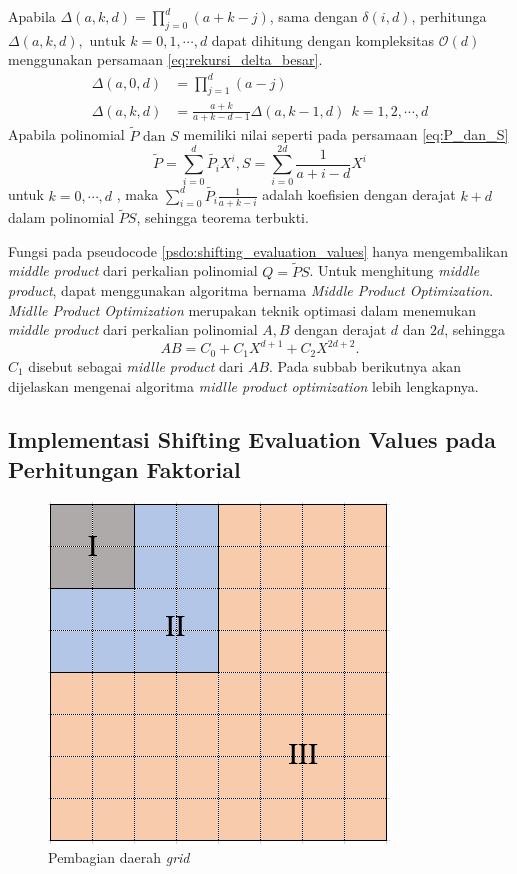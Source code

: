 Apabila  $ \Delta (a,k,d) = \prod_{j=0}^d (a+k-j) $, sama dengan $ \delta(i,d) $, perhitunga $ \Delta(a,k,d), \text{ untuk }k = 0, 1, \cdots, d $ dapat dihitung dengan kompleksitas $ \mathcal{O}{(d)} $ menggunakan persamaan \eqref{eq:rekursi_delta_besar}.
\begin{equation}
	\begin{aligned}
		\Delta (a,0,d) &= \prod_{j=1}^d(a-j) \\
		\Delta(a,k,d) &= \frac{a+k}{a+k - d - 1} \Delta(a,k-1,d)\ \ k = 1, 2, \cdots, d
	\end{aligned}
	\label{eq:rekursi_delta_besar}
\end{equation}
Apabila polinomial $ \tilde{P} \text{ dan } S $ memiliki nilai seperti pada persamaan \eqref{eq:P_dan_S}
\begin{equation}
	\tilde{P} = \sum_{i=0}^d \tilde{P_i} X^i , S = \sum_{i=0}^{2d} \frac{1}{a+i-d} X^i
	\label{eq:P_dan_S}
\end{equation}
untuk $ k=0, \cdots, d$ , maka $ \sum_{i=0}^d \tilde{P_i} \frac{1}{a+k-i} $ adalah koefisien dengan derajat $ k+d $ dalam polinomial $ \tilde{P}S $, sehingga teorema terbukti.

Fungsi pada pseudocode \ref{psdo:shifting_evaluation_values} hanya mengembalikan \textit{middle product} dari perkalian polinomial $ Q = \tilde{P}S $. Untuk menghitung \textit{middle product}, dapat menggunakan algoritma bernama \textit{Middle Product Optimization}.\textit{ Midlle Product Optimization} merupakan teknik optimasi dalam menemukan \textit{middle product} dari perkalian polinomial $ A , B $ dengan derajat $ d $ dan $ 2d $, sehingga $$ AB = C_0 + C_1X^{d+1} + C_2X^{2d+2}. $$ $ C_1 $ disebut sebagai \textit{midlle product} dari $ AB $. Pada subbab berikutnya akan dijelaskan mengenai algoritma \textit{midlle product optimization} lebih lengkapnya. 

\subsection{Implementasi Shifting Evaluation Values pada Perhitungan Faktorial}

\begin{figure}
	\Centering
	\includegraphics [scale=0.6]{bab2/img/kotak-pembagian-daerah}
	\caption {Pembagian daerah \textit{\textit{grid}}}
	\label {fig:kotak-pembagian-daerah}
\end{figure}

